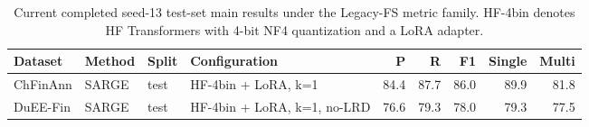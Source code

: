 \begin{table}[t]
\centering
\small
\begin{tabular}{llllrrrrr}
\toprule
Dataset & Method & Split & Configuration & P & R & F1 & Single & Multi \\
\midrule
ChFinAnn & SARGE & test & HF-4bin + LoRA, k=1 & 84.4 & 87.7 & 86.0 & 89.9 & 81.8 \\
DuEE-Fin & SARGE & test & HF-4bin + LoRA, k=1, no-LRD & 76.6 & 79.3 & 78.0 & 79.3 & 77.5 \\
\bottomrule
\end{tabular}
\caption{Current completed seed-13 test-set main results under the Legacy-FS metric family. HF-4bin denotes HF Transformers with 4-bit NF4 quantization and a LoRA adapter.}
\label{tab:main-results}
\end{table}
